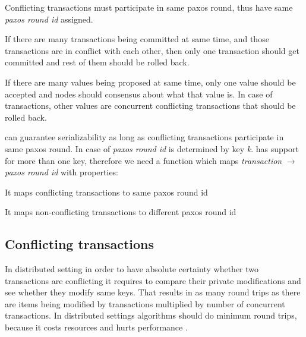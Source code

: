 \begin{definition}
  \label{def:samePaxosStateProperty}
  Conflicting transactions must participate in same paxos round, thus have same \emph{paxos round id} assigned.  
\end{definition}

\begin{definition}
  \label{def:txSerializability}
  If there are many transactions being committed at same time, and those transactions are in conflict with each other, then only one transaction should get committed and rest of them should be rolled back.   
\end{definition}


If there are many values being proposed at same time, only one value should be accepted and nodes should consensus about what that value is. In case of transactions, other values are concurrent conflicting transactions that should be rolled back.

\paxos can guarantee serializability as long as conflicting transactions participate in same paxos round. In case of \lwt \emph{paxos round id} is determined by key \emph{k}. \mpp has support for more than one key, therefore we need a function which maps \emph{transaction} $\rightarrow $ \emph{paxos round id} with properties: 
\begin{enumerate*}
\item It maps conflicting transactions to same paxos round id 
\item It maps non-conflicting transactions to different paxos round id
\end{enumerate*}


\subsection{Conflicting transactions}\label{sec:theory:conflictFunctions}
In distributed setting in order to have absolute certainty whether two transactions are conflicting it requires to compare their private modifications and see whether they modify same keys. That results in as many round trips as there are items being modified by transactions multiplied by number of concurrent transactions. In distributed settings algorithms should do minimum round trips, because it costs resources and hurts performance \cite{rotem2006fallacies}.

